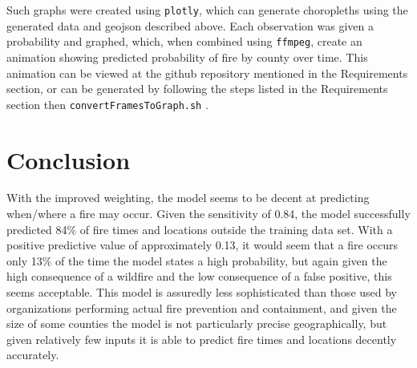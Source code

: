 \documentclass{article}
\begin{document}
Such graphs were created using \lstinline|plotly|, which can generate choropleths using the generated data and geojson described above. Each observation was given a probability and graphed, which, when combined using \lstinline|ffmpeg|, create an animation showing predicted probability of fire by county over time. This animation can be viewed at the github repository mentioned in the Requirements section, or can be generated by following the steps listed in the Requirements section then \lstinline|convertFramesToGraph.sh| .


\section{Conclusion}

With the improved weighting, the model seems to be decent at predicting when/where a fire may occur. Given the sensitivity of 0.84, the model successfully predicted 84\% of fire times and locations outside the training data set. With a positive predictive value of approximately 0.13, it would seem that a fire occurs only 13\% of the time the model states a high probability, but again given the high consequence of a wildfire and the low consequence of a false positive, this seems acceptable. This model is assuredly less sophisticated than those used by organizations performing actual fire prevention and containment, and given the size of some counties the model is not particularly precise geographically, but given relatively few inputs it is able to predict fire times and locations decently accurately. 
\end{document}
